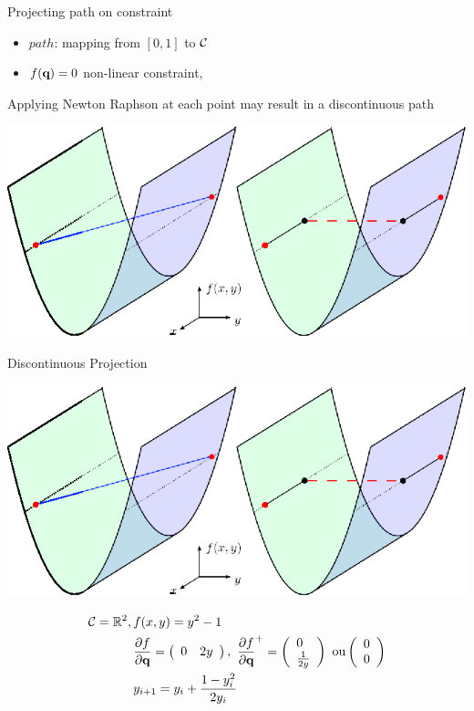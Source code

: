 \begin {frame} {Projecting path on constraint}
  \begin {itemize}
  \item $path$: mapping from $[0,1]$ to ${\cal C}$
  \item $f(\textbf{q}) = 0$ non-linear constraint,
  \end {itemize}
  Applying Newton Raphson at each point may result in a discontinuous path
  \begin {center}
  \includegraphics [width=.5\linewidth]{figures/second_order_polynomial2.eps}
  \end {center}
\end {frame}

%
%

\begin {frame} {Discontinuous Projection}
  \begin {center}
  \includegraphics [width=.5\linewidth]{figures/second_order_polynomial2.eps}
  \end {center}
  \begin{align*}
  \CS=\real^2,\, & f(x,y) = y^2-1\\
  &\frac{\partial f}{\partial \conf} = \left(\begin{array}{ll}
  0 & 2y\end{array}\right),\ 
  \frac{\partial f}{\partial \conf}^{+} = \left(\begin{array}{l}
  0 \\ \frac{1}{2y}\end{array}\right)\ \mbox{ou} \left(\begin{array}{l}
  0 \\ 0\end{array}\right)\\
  & y_{i+1} = y_i + \frac {1-y_i^2}{2y_i}
  \end{align*}
\end {frame}

